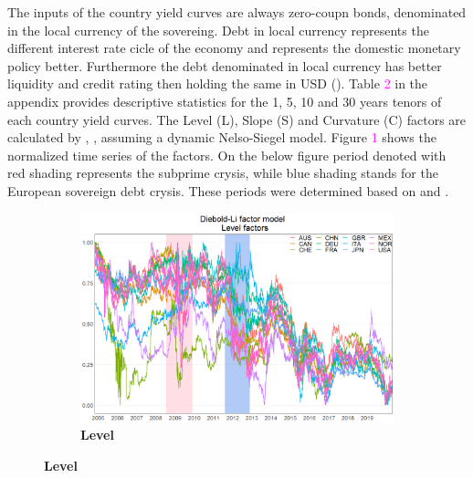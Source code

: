 \documentclass[12pt,bibliography=totoc]{article}
\begin{document}
{The inputs of the country yield curves are always zero-coupn bonds, denominated in the local currency of the sovereing. Debt in local currency represents the different interest rate cicle of the economy and represents the domestic monetary policy better. Furthermore the debt denominated in local currency has better liquidity and credit rating then holding the same in USD  (\cite{sowmya2016linkages}). Table \textcolor{magenta}{2} in the appendix provides descriptive statistics for the 1, 5, 10 and 30 years tenors of each country yield curves. The Level (L), Slope (S) and Curvature (C) factors are calculated by \cite{diebold2006forecasting}, \cite{diebold2008global}, assuming a dynamic Nelso-Siegel model. Figure \textcolor{magenta}{1} shows the normalized time series of the factors.  On the below figure period denoted with red shading represents the subprime crysis, while blue shading stands for the European sovereign debt crysis. These periods were determined based on \cite{bostanci2020connected} and \cite{hue2019measuring}.


\begin{figure}[H]
\centering

\begin{subfigure}{.5\linewidth}
\centering
\includegraphics[width=\linewidth]{levels}
\caption{\textbf{Level}}


\end{subfigure}
\end{figure}}
\end{document}
